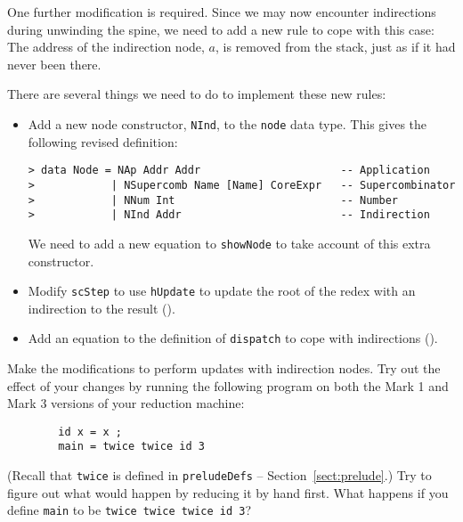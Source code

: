 One further modification is required.  Since we may now encounter
indirections
during unwinding
the spine, we need to add a new rule to cope with this case:
\label{rule:unwind-ind}
The address of the indirection node,
$a$, is removed from the stack, just
as if it had never been there.

There are several things we need to do to implement these new rules:
\begin{itemize}
\item
Add a new node constructor, \mbox{\tt NInd}, to the \mbox{\tt node} data type.
This gives the following revised definition:
\begin{verbatim}
> data Node = NAp Addr Addr                      -- Application
>            | NSupercomb Name [Name] CoreExpr   -- Supercombinator
>            | NNum Int                          -- Number
>            | NInd Addr                         -- Indirection
\end{verbatim}
%
%
%
%
We need to add a new equation to \mbox{\tt showNode} to take account of this
extra constructor.
\item
Modify \mbox{\tt scStep} to use \mbox{\tt hUpdate} to
update the root of the redex with an indirection
to the result ().
\item
Add an equation to the definition of \mbox{\tt dispatch} to cope with indirections
().
\end{itemize}

\begin{exercise}
Make the modifications to perform updates with indirection nodes.
Try out the effect of your changes by running the following program
on both the Mark 1 and Mark 3 versions of your reduction machine:
\begin{verbatim}
        id x = x ;
        main = twice twice id 3
\end{verbatim}
(Recall that \mbox{\tt twice} is defined in \mbox{\tt preludeDefs}
-- Section~\ref{sect:prelude}.)
Try to figure out what would happen by reducing it by hand first.
What happens if you define \mbox{\tt main} to be \mbox{\tt twice\ twice\ twice\ id\ 3}?
\end{exercise}


